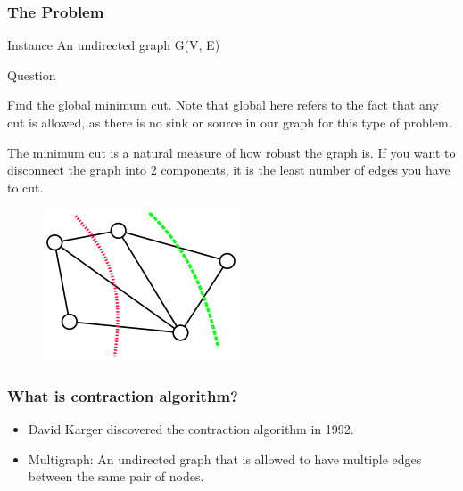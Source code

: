 \documentclass{beamer}
\begin{document}
\begin{frame}
\frametitle{The Problem}
\begin{block}{Instance}
An undirected graph G(V, E)	
\end{block}
\begin{block}{Question}

Find the global minimum cut. Note that global here refers to the fact that any cut is allowed, as there is no sink or source in our graph for this type of problem.
\end{block}
		


\end{frame}
\begin{frame}
	The minimum cut is a natural measure of how robust the graph is. If you want to disconnect the graph into 2 components, it is the least number of edges you have to cut.
	\begin{figure}
		\includegraphics{images/220px-Min_cut_example.png}

	\end{figure}
	\end{frame}

\begin{frame}
\frametitle{What is contraction algorithm?}
\begin{itemize}
	\item David Karger discovered the contraction algorithm in 1992.
	\item Multigraph: An undirected graph that is allowed to have multiple edges between the same pair of nodes.
\end{itemize}
\end{frame}
\end{document}
